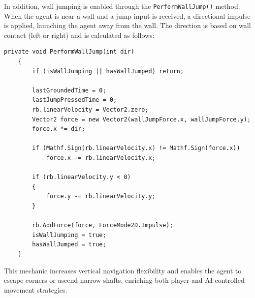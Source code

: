 \documentclass[12pt,oneside,openright,a4paper]{cpe-english-project}
\begin{document}
\begin{itemize}
In addition, wall jumping is enabled through the \texttt{PerformWallJump()} method. When the agent is near a wall and a jump input is received, a directional impulse is applied, launching the agent away from the wall. The direction is based on wall contact (left or right) and is calculated as follows:
\begin{lstlisting}[language={[Sharp]C}]
	private void PerformWallJump(int dir)
	{
		if (isWallJumping || hasWallJumped) return;
		
		lastGroundedTime = 0;
		lastJumpPressedTime = 0;
		rb.linearVelocity = Vector2.zero;
		Vector2 force = new Vector2(wallJumpForce.x, wallJumpForce.y);
		force.x *= dir;
		
		if (Mathf.Sign(rb.linearVelocity.x) != Mathf.Sign(force.x))
			force.x -= rb.linearVelocity.x;
			
		if (rb.linearVelocity.y < 0)
		{
			force.y -= rb.linearVelocity.y;
		}
		
		rb.AddForce(force, ForceMode2D.Impulse);
		isWallJumping = true;
		hasWallJumped = true;
	}
\end{lstlisting}
This mechanic increases vertical navigation flexibility and enables the agent to escape corners or ascend narrow shafts, enriching both player and AI-controlled movement strategies.
\end{itemize}
\end{document}
